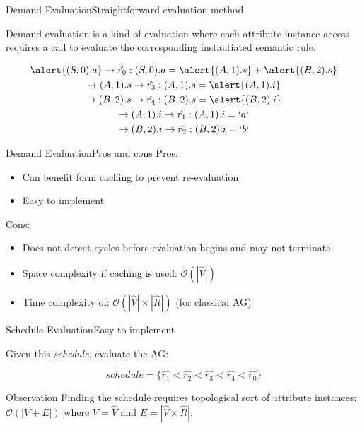\begin{frame}{Demand Evaluation}{Straightforward evaluation method}
\begin{definition}
Demand evaluation is a kind of evaluation where each attribute instance access requires a call to evaluate the corresponding instantiated semantic rule.
\end{definition}

\begin{gather*}
\alert{(S, 0).a } \to \hat{r_0}: (S, 0).a = \alert{(A, 1).s} + \alert{(B,2).s} \\
\to (A, 1).s \to \hat{r_3}: (A,1).s = \alert{(A,1).i} \\
\to (B,2).s \to \hat{r_4}: (B,2).s = \alert{(B,2).i} \\
\to (A,1).i \to \hat{r_1}: (A, 1).i = `a` \\
\to (B,2).i \to \hat{r_2}: (B, 2).i = `b`
\end{gather*}
\end{frame}


\begin{frame}{Demand Evaluation}{Pros and cons}
Pros:
\begin{itemize}
    \item Can benefit form \alert{caching to prevent re-evaluation}
    \item Easy to implement
\end{itemize}

Cons:
\begin{itemize}
    \item Does not detect cycles before evaluation begins and \alert{may not terminate}
    \item Space complexity if \alert{caching} is used: $\mathcal{O}(|\hat{V}|)$
    \item Time complexity of: $\mathcal{O}(| \hat{V} | \times | \hat{R} |)$ (for classical AG)
\end{itemize}
\end{frame}


\begin{frame}{Schedule Evaluation}{Easy to implement}

Given this \emph{schedule}, evaluate the AG:

\[ \mathit{schedule} = \{ \hat{r_1} < \hat{r_2} < \hat{r_3} < \hat{r_4} < \hat{r_0}  \} \]

\begin{alertblock}{Observation}
Finding the schedule requires topological sort of attribute instances: $\mathcal{O}(| V +  E|)$ where $V = \hat{V}$ and $E = |\hat{V}  \times  \hat{R}|$.
\end{alertblock}
\end{frame}


